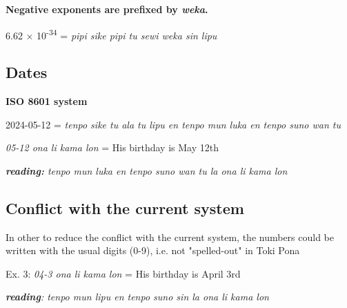 \documentclass{article}
\begin{document}
	\textbf{Negative exponents are prefixed by \textit{weka}.}

		\vspace{5pt}
	
	6.62 × 10\textsuperscript{-34} = \emph{pipi sike pipi tu sewi weka sin
		lipu}
	
	\subsection{Dates}
	
	\textbf{ISO 8601 system}
	\vspace{5pt}
	
	2024-05-12 = \emph{tenpo sike tu ala tu lipu en tenpo mun luka en tenpo
		suno wan tu}
	
	\vspace{5pt}
	
	
	\emph{05-12 ona li kama lon} = His birthday is May 12th
	
	\vspace{5pt}
	
	\emph{\textbf{reading:} tenpo mun luka en tenpo suno wan tu la ona li kama lon}

	\vspace{5pt}
	
	{\huge{}}
	
	
	\subsection{Conflict with the current system}

\vspace{5pt}


In other to reduce the conflict with the current system, the numbers could be written with the usual digits (0-9), i.e. not "spelled-out" in Toki Pona

	\vspace{5pt}

Ex. 3: \emph{04-3 ona li kama lon} = His birthday is April 3rd

\emph{\textbf{reading}: tenpo mun lipu en tenpo suno sin la ona li kama lon}

\huge{}
	
	
	
\end{document}
